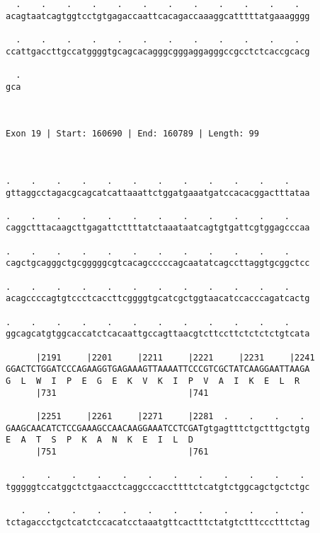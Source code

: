 \documentclass{article}
\begin{document}
\begin{Verbatim}
  .    .    .    .    .    .    .    .    .    .    .    .  
acagtaatcagtggtcctgtgagaccaattcacagaccaaaggcatttttatgaaagggg
                                                            
  .    .    .    .    .    .    .    .    .    .    .    .  
ccattgaccttgccatggggtgcagcacagggcgggaggagggccgcctctcaccgcacg
                                                            
  .
gca
   
   
 
Exon 19 | Start: 160690 | End: 160789 | Length: 99



.    .    .    .    .    .    .    .    .    .    .    .    
gttaggcctagacgcagcatcattaaattctggatgaaatgatccacacggactttataa
                                                            
.    .    .    .    .    .    .    .    .    .    .    .    
caggctttacaagcttgagattcttttatctaaataatcagtgtgattcgtggagcccaa
                                                            
.    .    .    .    .    .    .    .    .    .    .    .    
cagctgcagggctgcgggggcgtcacagcccccagcaatatcagccttaggtgcggctcc
                                                            
.    .    .    .    .    .    .    .    .    .    .    .    
acagccccagtgtccctcaccttcggggtgcatcgctggtaacatccacccagatcactg
                                                            
.    .    .    .    .    .    .    .    .    .    .    .    
ggcagcatgtggcaccatctcacaattgccagttaacgtcttccttctctctctgtcata
                                                            
      |2191     |2201     |2211     |2221     |2231     |2241
GGACTCTGGATCCCAGAAGGTGAGAAAGTTAAAATTCCCGTCGCTATCAAGGAATTAAGA
G  L  W  I  P  E  G  E  K  V  K  I  P  V  A  I  K  E  L  R  
      |731                          |741                    
  
      |2251     |2261     |2271     |2281  .    .    .    . 
GAAGCAACATCTCCGAAAGCCAACAAGGAAATCCTCGATgtgagtttctgctttgctgtg
E  A  T  S  P  K  A  N  K  E  I  L  D                       
      |751                          |761                    
  
   .    .    .    .    .    .    .    .    .    .    .    . 
tgggggtccatggctctgaacctcaggcccaccttttctcatgtctggcagctgctctgc
                                                            
   .    .    .    .    .    .    .    .    .    .    .    . 
tctagaccctgctcatctccacatcctaaatgttcactttctatgtctttccctttctag
                                                            

\end{Verbatim}
\end{document}
